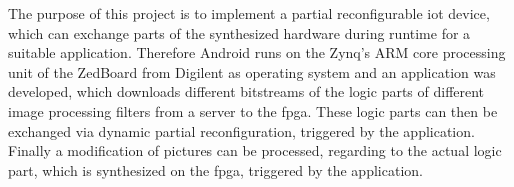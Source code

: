 The purpose of this project is to implement a partial reconfigurable \gls{iot} device, which can exchange parts of the synthesized hardware during runtime for a suitable application. Therefore Android runs on the Zynq's ARM core processing unit of the ZedBoard from Digilent as operating system and an application was developed, which downloads different bitstreams of the logic parts of different image processing filters from a server to the \gls{fpga}. These logic parts can then be exchanged via dynamic partial reconfiguration, triggered by the application. Finally a modification of pictures can be processed, regarding to the actual logic part, which is synthesized on the \gls{fpga}, triggered by the application.
